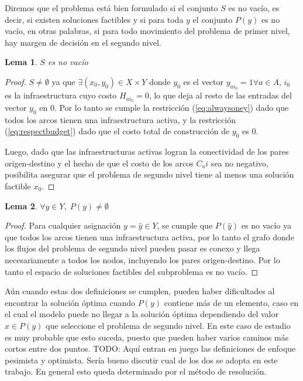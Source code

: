 \documentclass{article}
\newtheorem{lemma}{Lema}
\begin{document}
  Diremos que el problema está bien formulado si el conjunto $S$ es no vacío, es decir, si existen soluciones factibles y si para toda $y$ el conjunto $P(y)$ es no vacío, en otras palabras, si para todo movimiento del problema de primer nivel, hay margen de decisión en el segundo nivel.

  \begin{lemma}$S$ es no vacío
  \end{lemma}

  \begin{proof}
    $S \neq \emptyset$ ya que $\exists (x_0, y_0) \in X \times Y$ donde $y_0$ es el vector $y_{ai_0} = 1 \forall a \in A$, $i_0$ es la infraestructura cuyo costo $H_{ai_0} = 0$, lo que deja al resto de las entradas del vector $y_0$ en $0$. Por lo tanto se cumple la restricción (\ref{eq:alwaysoney}) dado que todos los arcos tienen una infraestructura activa, y la restricción (\ref{eq:respectbudget}) dado que el costo total de construcción de $y_0$ es $0$.

    Luego, dado que las infraestructuras activas logran la conectividad de los pares origen-destino y el hecho de que el costo de los arcos $C_ai$ sea no negativo, posibilita asegurar que el problema de segundo nivel tiene al menos una solución factible $x_0$.
  \end{proof}

  \begin{lemma}$\forall y \in Y,\; P(y) \neq \emptyset$
  \end{lemma}

  \begin{proof}
    Para cualquier asignación $y = \hat{y} \in Y$, se cumple que $P(\hat{y})$ es no vacío ya que todos los arcos tienen una infraestructura activa, por lo tanto el grafo donde los flujos del problema de segundo nivel pueden pasar es conexo y llega necesariamente a todos los nodos, incluyendo los pares origen-destino. Por lo tanto el espacio de soluciones factibles del subproblema es no vacío. 
  \end{proof}

  Aún cuando estas dos definiciones se cumplen, pueden haber dificultades al encontrar la solución óptima cuando $P(y)$ contiene más de un elemento, caso en el cual el modelo puede no llegar a la solución óptima dependiendo del valor $x \in P(y)$ que seleccione el problema de segundo nivel. En este caso de estudio es muy probable que esto suceda, puesto que pueden haber varios caminos más cortos entre dos puntos.
  TODO: Aquí entran en juego las definiciones de enfoque pesimista y optimista. Sería bueno discutir cual de los dos se adopta en este trabajo. En general esto queda determinado por el método de resolución.
\end{document}
